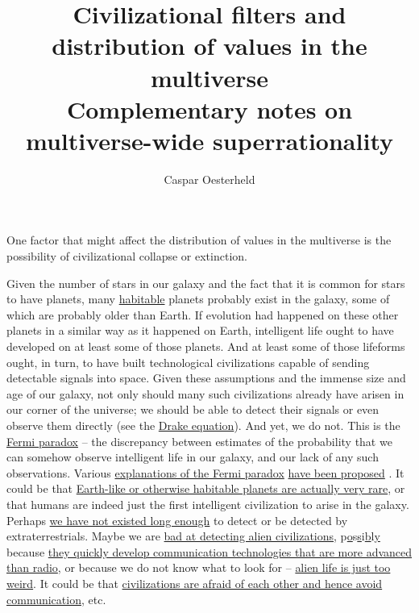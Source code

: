 \documentclass[]{article}
\title{Civilizational filters and distribution of values in the multiverse\\ \vspace{5mm} \small{Complementary notes on multiverse-wide superrationality}}
\author{Caspar Oesterheld}
\date{}
\begin{document}
\maketitle

One factor that might affect the distribution of values in the
multiverse is the possibility of civilizational collapse or extinction.

Given the number of stars in our galaxy and the fact that it is common
for stars to have planets, many
\href{https://en.wikipedia.org/wiki/Planetary_habitability}{habitable}
planets probably exist in the galaxy, some of which are probably older
than Earth. If evolution had happened on these other planets in a
similar way as it happened on Earth, intelligent life ought to have
developed on at least some of those planets. And at least some of those
lifeforms ought, in turn, to have built technological civilizations
capable of sending detectable signals into space. Given these
assumptions and the immense size and age of our galaxy, not only should
many such civilizations already have arisen in our corner of the
universe; we should be able to detect their signals or even observe them
directly (see the
\href{https://en.wikipedia.org/wiki/Drake_equation}{Drake
equation}). And yet, we do not. This is the
\href{https://en.wikipedia.org/wiki/Fermi_paradox}{Fermi paradox}
-- the discrepancy
between estimates of the probability that we can somehow observe
intelligent life in our galaxy, and our lack of any such observations.
Various
\href{https://en.wikipedia.org/wiki/Fermi_paradox\#Hypothetical_explanations_for_the_paradox}{explanations
of the Fermi paradox}
\href{http://reducing-suffering.org/ranking-explanations-of-the-fermi-paradox/}{have
been proposed} \parencite{Webb2015-vi}. It could be that
\href{https://en.wikipedia.org/wiki/Rare_Earth_hypothesis}{Earth-like
or otherwise habitable planets are actually very rare}, or that humans
are indeed just the first intelligent civilization to arise in the
galaxy. Perhaps
\href{https://en.wikipedia.org/wiki/Fermi_paradox\#Human_beings_have_not_existed_long_enough}{we
have not existed long enough} to detect or be detected by
extraterrestrials. Maybe we are
\href{https://en.wikipedia.org/wiki/Fermi_paradox\#Humans_are_not_listening_properly}{bad
at detecting alien civilizations},
p\href{https://en.wikipedia.org/wiki/Fermi_paradox\#Humans_are_not_listening_properly}{o}s\href{https://en.wikipedia.org/wiki/Fermi_paradox\#Humans_are_not_listening_properly}{s}i\href{https://en.wikipedia.org/wiki/Fermi_paradox\#Humans_are_not_listening_properly}{b}l\href{https://en.wikipedia.org/wiki/Fermi_paradox\#Humans_are_not_listening_properly}{y}
because
\href{https://en.wikipedia.org/wiki/Fermi_paradox\#Civilizations_broadcast_detectable_radio_signals_only_for_a_brief_period_of_time}{they
quickly develop communication technologies that are more advanced than
radio}, or because we do not know what to look for --
\href{https://en.wikipedia.org/wiki/Fermi_paradox\#They_are_too_alien}{alien
life is just too weird}. It could be that
\href{https://en.wikipedia.org/wiki/Fermi_paradox\#It_is_dangerous_to_communicate}{civilizations
are afraid of each other and hence avoid communication}, etc.
\end{document}
